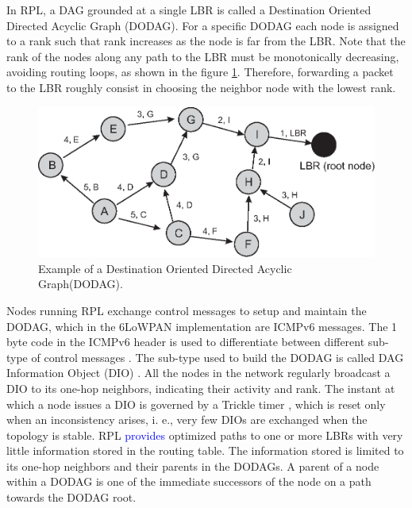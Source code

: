 \documentclass[authoryear,preprint,review,12pt]{elsarticle}
\newcommand{\rev}{\textcolor{blue}}
\begin{document}
In RPL, a DAG grounded at a single LBR is called a Destination Oriented Directed Acyclic Graph (DODAG). For a specific DODAG each node is assigned to a rank such that rank increases as the node is far from the LBR. Note that the rank of the nodes along any path to the LBR must be monotonically decreasing, avoiding routing loops, as shown in the figure \ref{RPL_DIO}. Therefore, forwarding a packet to the LBR roughly consist in choosing the neighbor node with the lowest rank.

\begin{figure}[h!tb]
\centering
\includegraphics[width=1\textwidth]{figures/RPL_DIO}
\caption{Example of a Destination Oriented Directed Acyclic Graph(DODAG).}
\label{RPL_DIO}
\end{figure}

Nodes running RPL exchange control messages to setup and maintain the DODAG, which in the 6LoWPAN implementation are ICMPv6 messages. The 1 byte code in the ICMPv6 header is used to differentiate between different sub-type of control messages \citep{RFC4443}. The sub-type used to build the DODAG is called DAG Information Object (DIO) \citep{RFC6550}. All the nodes in the network regularly broadcast a DIO to its one-hop neighbors, indicating their activity and rank. The instant at which a node issues a DIO is governed by a Trickle timer \citep{trickle}, which is reset only when an inconsistency arises, i. e., very few DIOs are exchanged when the topology is stable. RPL \rev{provides} optimized paths to one or more LBRs with very little information stored in the routing table. The information stored is limited to its one-hop neighbors and their parents in the DODAGs. A parent of a node within a DODAG is one of the immediate successors of the node on a path towards the DODAG root.
\end{document}
